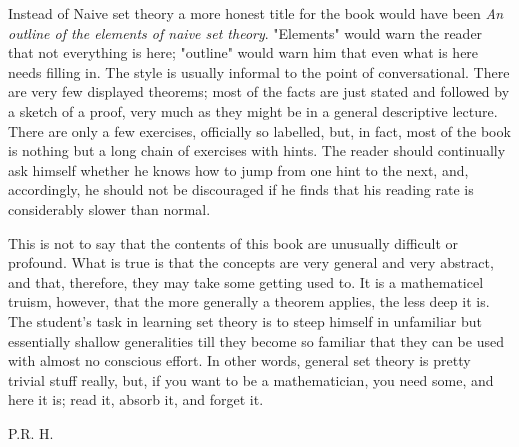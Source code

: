 	Instead of Naive set theory a more honest title for the book would have been \textit{An outline of the elements of naive set theory}. "Elements" would warn the reader that not everything is here; "outline" would warn him that even what is here needs filling in. The style is usually informal to the point of conversational. There are very few displayed theorems; most of the facts are just stated and followed by a sketch of a proof, very much as they might be in a general descriptive lecture. There are only a few exercises, officially so labelled, but, in fact, most of the book is nothing but a long chain of exercises with hints. The reader should continually ask himself whether he knows how to jump from one hint to the next, and, accordingly, he should not be discouraged if he finds that his reading rate is considerably slower than normal. 
    

	This is not to say that the contents of this book are unusually difficult or profound. What is true is that the concepts are very general and very abstract, and that, therefore, they may take some getting used to. It is a mathematicel truism, however, that the more generally a theorem applies, the less deep it is. The student's task in learning set theory is to steep himself in unfamiliar but essentially shallow generalities till they become so familiar that they can be used with almost no conscious effort. In other words, general set theory is pretty trivial stuff really, but, if you want to be a mathematician, you need some, and here it is; read it, absorb it, and forget it.

P.R. H.
